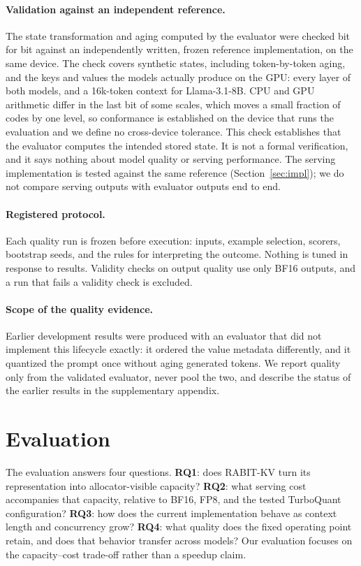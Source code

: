 \documentclass{article}
\begin{document}
\paragraph{Validation against an independent reference.}
The state transformation and aging computed by the evaluator were checked bit for bit against an
independently written, frozen reference implementation, on the same device. The check covers synthetic
states, including token-by-token aging, and the keys and values the models actually produce on the GPU:
every layer of both models, and a 16k-token context for Llama-3.1-8B. CPU and GPU arithmetic differ in
the last bit of some scales, which moves a small fraction of codes by one level, so conformance is
established on the device that runs the evaluation and we define no cross-device tolerance. This check
establishes that the evaluator computes the intended stored state. It is not a formal verification, and
it says nothing about model quality or serving performance. The serving implementation is tested
against the same reference (Section~\ref{sec:impl}); we do not compare serving outputs with evaluator
outputs end to end.

\paragraph{Registered protocol.}
Each quality run is frozen before execution: inputs, example selection, scorers, bootstrap seeds, and
the rules for interpreting the outcome. Nothing is tuned in response to results. Validity checks on
output quality use only BF16 outputs, and a run that fails a validity check is excluded.

\paragraph{Scope of the quality evidence.}
Earlier development results were produced with an evaluator that did not implement this lifecycle
exactly: it ordered the value metadata differently, and it quantized the prompt once without aging
generated tokens. We report quality only from the validated evaluator, never pool the two, and
describe the status of the earlier results in the supplementary appendix.

\section{Evaluation}
\label{sec:eval}

The evaluation answers four questions. \textbf{RQ1}: does RABIT-KV turn its representation into
allocator-visible capacity? \textbf{RQ2}: what serving cost accompanies that capacity, relative to
BF16, FP8, and the tested TurboQuant configuration? \textbf{RQ3}: how does the current implementation
behave as context length and concurrency grow? \textbf{RQ4}: what quality does the fixed operating
point retain, and does that behavior transfer across models? Our evaluation focuses on the
capacity--cost trade-off rather than a speedup claim.
\end{document}
